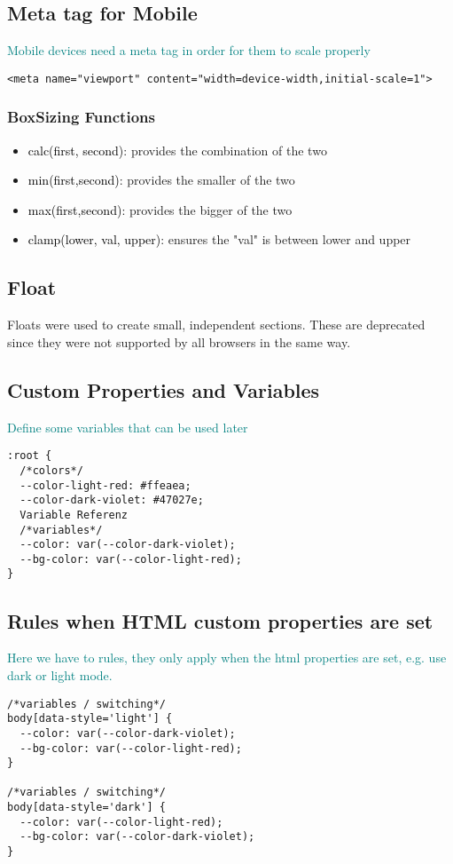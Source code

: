 \documentclass[main.tex,fontsize=8pt,paper=a4,paper=portrait,DIV=calc,]{scrartcl}
\begin{document}
\subsection{Meta tag for Mobile}
\textcolor{teal}{Mobile devices need a meta tag in order for them to scale properly}
\begin{lstlisting}
<meta name="viewport" content="width=device-width,initial-scale=1">
\end{lstlisting}

\subsubsection{BoxSizing Functions}
\begin{itemize}
\item \textcolor{black}{calc(first, second)}: provides the combination of the two
\item \textcolor{black}{min(first,second)}: provides the smaller of the two
\item \textcolor{black}{max(first,second)}: provides the bigger of the two
\item \textcolor{black}{clamp(lower, val, upper)}: ensures the "val" is between lower and upper 
\end{itemize} 


\lstset{
    language=CSS,
    style=code,
}

\subsection{Float}
Floats were used to create small, independent sections. These are deprecated since they were not supported by all browsers in the same way.

\subsection{Custom Properties and Variables}
\textcolor{teal}{Define some variables that can be used later}
\begin{lstlisting}
:root {
  /*colors*/
  --color-light-red: #ffeaea;
  --color-dark-violet: #47027e;
  Variable Referenz
  /*variables*/
  --color: var(--color-dark-violet);
  --bg-color: var(--color-light-red);
}
\end{lstlisting}

\subsection{Rules when HTML custom properties are set}
\textcolor{teal}{Here we have to rules, they only apply when the html properties are set, e.g. use dark or light mode.}
\begin{lstlisting}
/*variables / switching*/
body[data-style='light'] {
  --color: var(--color-dark-violet);
  --bg-color: var(--color-light-red);
}

/*variables / switching*/
body[data-style='dark'] {
  --color: var(--color-light-red);
  --bg-color: var(--color-dark-violet);
}
\end{lstlisting}


\lstset{
    language=HTML,
    style=code,
}
\end{document}
